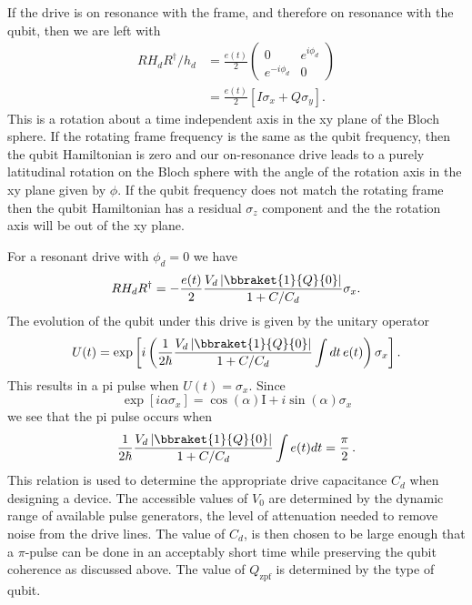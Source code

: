 If the drive is on resonance with the frame, and therefore on resonance with the qubit, then we are left with
\begin{align}
RH_dR^{\dagger}/h_d
&= \frac{e(t)}{2}\left( \begin{array}{cc} 0 & e^{i\phi_d} \\ e^{-i\phi_d} & 0 \end{array}\right) \\
&= \frac{e(t)}{2} \left[ I \sigma_x + Q \sigma_y \right] .
\end{align}
This is a rotation about a time independent axis in the xy plane of the Bloch sphere.
If the rotating frame frequency is the same as the qubit frequency, then the qubit Hamiltonian is zero and our on-resonance drive leads to a purely latitudinal rotation on the Bloch sphere with the angle of the rotation axis in the xy plane given by $\phi$.
If the qubit frequency does not match the rotating frame then the qubit Hamiltonian has a residual $\sigma_z$ component and the the rotation axis will be out of the xy plane.


For a resonant drive with $\phi_d=0$ we have \begin{equation}
RH_dR^{\dagger} = -\frac{e(t)}{2}\frac{V_d \left| \bbraket{1}{Q}{0} \right|} {1 + C/C_d} \sigma_x. \end{equation}
The evolution of the qubit under this drive is given by the unitary operator \begin{equation}
U(t) = \exp \left[ i \left( \frac{1}{2 \hbar} \frac{V_d \left| \bbraket{1}{Q}{0} \right|} {1 + C/C_d} \int dt \, e(t) \right) \sigma_x \right]. \end{equation}
This results in a pi pulse when $U(t)=\sigma_x$. Since \begin{equation}
\exp \left[ i \alpha \sigma_x \right] = \cos(\alpha)\textrm{I} + i \sin(\alpha)\sigma_x \end{equation}
we see that the pi pulse occurs when \begin{equation}
\frac{1}{2\hbar} \frac{V_d \left| \bbraket{1}{Q}{0} \right|} {1 + C/C_d} \int e(t) dt = \frac{\pi}{2} \, . \end{equation}
This relation is used to determine the appropriate drive capacitance $C_d$ when designing a device.
The accessible values of $V_0$ are determined by the dynamic range of available pulse generators, the level of attenuation needed to remove noise from the drive lines.
The value of $C_d$, is then chosen to be large enough that a $\pi$-pulse can be done in an acceptably short time while preserving the qubit coherence as discussed above.
The value of $Q_{\textrm{zpf}}$ is determined by the type of qubit.

